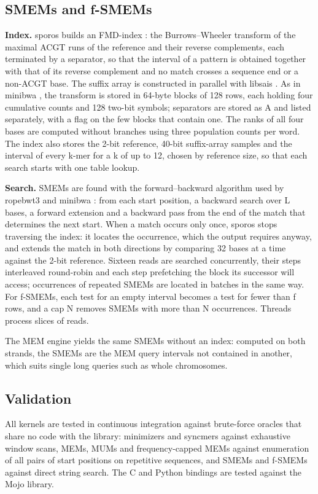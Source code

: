 \subsection{SMEMs and f-SMEMs}

\textbf{Index.} sporos builds an FMD-index \citep{Li2012}: the Burrows--Wheeler transform \citep{BurrowsWheeler1994} of the maximal ACGT runs of the reference and their reverse complements, each terminated by a separator, so that the interval of a pattern is obtained together with that of its reverse complement and no match crosses a sequence end or a non-ACGT base. The suffix array is constructed in parallel with libsais \citep{libsais}. As in minibwa \citep{Li2026}, the transform is stored in 64-byte blocks of 128 rows, each holding four cumulative counts and 128 two-bit symbols; separators are stored as A and listed separately, with a flag on the few blocks that contain one. The ranks of all four bases are computed without branches using three population counts per word. The index also stores the 2-bit reference, 40-bit suffix-array samples and the interval of every k-mer for a k of up to 12, chosen by reference size, so that each search starts with one table lookup.

\textbf{Search.} SMEMs are found with the forward--backward algorithm \citep{Gagie2024} used by ropebwt3 and minibwa \citep{Li2024,Li2026}: from each start position, a backward search over L bases, a forward extension and a backward pass from the end of the match that determines the next start. When a match occurs only once, sporos stops traversing the index: it locates the occurrence, which the output requires anyway, and extends the match in both directions by comparing 32 bases at a time against the 2-bit reference. Sixteen reads are searched concurrently, their steps interleaved round-robin and each step prefetching the block its successor will access; occurrences of repeated SMEMs are located in batches in the same way. For f-SMEMs, each test for an empty interval becomes a test for fewer than f rows, and a cap N removes SMEMs with more than N occurrences. Threads process slices of reads.

The MEM engine yields the same SMEMs without an index: computed on both strands, the SMEMs are the MEM query intervals not contained in another, which suits single long queries such as whole chromosomes.

\subsection{Validation}

All kernels are tested in continuous integration against brute-force oracles that share no code with the library: minimizers and syncmers against exhaustive window scans, MEMs, MUMs and frequency-capped MEMs against enumeration of all pairs of start positions on repetitive sequences, and SMEMs and f-SMEMs against direct string search. The C and Python bindings are tested against the Mojo library.
